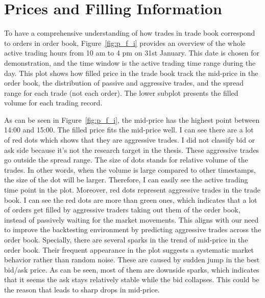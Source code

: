 \section{Prices and Filling Information} \label{sec:price}
To have a comprehensive understanding of how trades in trade book correspond to orders in order book, Figure~\ref{fig:p_f_i} provides an overview of the whole active trading hours from 10 am to 4 pm on 31st January. This date is chosen for demonstration, and the time window is the active trading time range during the day. This plot shows how filled price in the trade book track the mid-price in the order book, the distribution of passive and aggressive trades, and the spread range for each trade (not each order). The lower subplot presents the filled volume for each trading record.



As can be seen in Figure~\ref{fig:p_f_i}, the mid-price has the highest point between 14:00 and 15:00. The filled price fits the mid-price well. I can see there are a lot of red dots which shows that they are aggressive trades. I did not classify bid or ask side because it's not the research target in the thesis. These aggressive trades go outside the spread range. The size of dots stands for relative volume of the trades. In other words, when the volume is large compared to other timestamps, the size of the dot will be larger. Therefore, I can easily see the active trading time point in the plot. Moreover, red dots represent aggressive trades in the trade book. I can see the red dots are more than green ones, which indicates that a lot of orders get filled by aggressive traders taking out them of the order book, instead of passively waiting for the market movements. This aligns with our need to improve the backtesting environment by predicting aggressive trades across the order book. Specially, there are several sparks in the trend of mid-price in the order book. Their frequent appearance in the plot suggests a systematic market behavior rather than random noise. These are caused by sudden jump in the best bid/ask price. As can be seen, most of them are downside sparks, which indicates that it seems the ask stays relatively stable while the bid collapses. This could be the reason that leads to sharp drops in mid-price.

